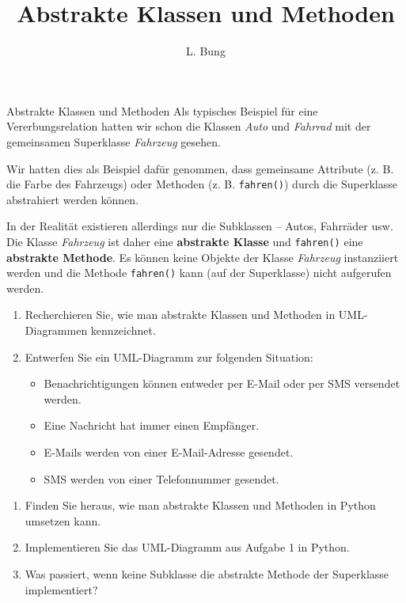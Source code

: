 \documentclass[11pt, a4paper, oneside]{article}
\begin{document}
	\author{L. Bung}
	\title{Abstrakte Klassen \hspace{10cm} und Methoden}
	\subject{SAE}
	\maketitle
	
	\begin{hint}{Abstrakte Klassen und Methoden}
		Als typisches Beispiel für eine Vererbungsrelation hatten wir schon die Klassen \emph{Auto} und \emph{Fahrrad} mit der gemeinsamen Superklasse \emph{Fahrzeug} gesehen.
		
		Wir hatten dies als Beispiel dafür genommen, dass gemeinsame Attribute (z. B. die Farbe des Fahrzeugs) oder Methoden (z. B. \texttt{fahren()}) durch die Superklasse abstrahiert werden können.
		
		In der Realität existieren allerdings nur die Subklassen -- Autos, Fahrräder usw.
		Die Klasse \emph{Fahrzeug} ist daher eine \textbf{abstrakte Klasse} und \texttt{fahren()} eine \textbf{abstrakte Methode}.
		Es können keine Objekte der Klasse \emph{Fahrzeug} instanziiert werden und die Methode \texttt{fahren()} kann (auf der Superklasse) nicht aufgerufen werden.
	\end{hint}
	
	
	
	\begin{enumerate}[label=\alph*)]
		\item Recherchieren Sie, wie man abstrakte Klassen und Methoden in UML-Diagrammen kennzeichnet.
		
		\lines[3cm]
		
		\item Entwerfen Sie ein UML-Diagramm zur folgenden Situation:
			\begin{itemize}
				\item Benachrichtigungen können entweder per E-Mail oder per SMS versendet werden.
				\item Eine Nachricht hat immer einen Empfänger.
				\item E-Mails werden von einer E-Mail-Adresse gesendet.
				\item SMS werden von einer Telefonnummer gesendet.
			\end{itemize}
			
			\boxarea[5cm]
	\end{enumerate}
	
	
	\begin{enumerate}[label=\alph*)]
		\item Finden Sie heraus, wie man abstrakte Klassen und Methoden in Python umsetzen kann.
		
		\lines[2cm]
		
		\item Implementieren Sie das UML-Diagramm aus Aufgabe 1 in Python.
		
		\item Was passiert, wenn keine Subklasse die abstrakte Methode der Superklasse implementiert?
		
		\lines[2cm]
	\end{enumerate}
	
\end{document}
